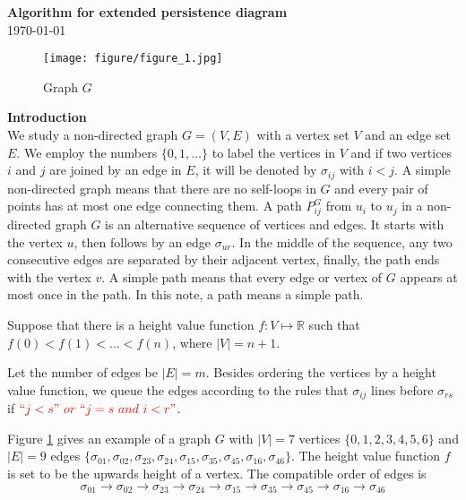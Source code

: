\documentclass[a4paper,12pt]{article}
\title{}
\numberwithin{equation}{section}
\begin{document}
\begin{center}
  \textbf{\Large Algorithm for extended persistence diagram}\\
  \today
\end{center}

\noindent

	\begin{figure}[!hbtp]
		\centering				
		\texttt{[image: figure/figure\_1.jpg]}
		\caption{Graph $G$}
		\label{fig:graph_G}		
	\end{figure}
	
	\noindent
	\textbf{Introduction}\\
	
	We study a non-directed graph $G=(V,E)$ with a vertex set $V$ and an edge set $E$. We employ the numbers $\{0,1,\ldots\}$ to label the vertices in $V$ and if two vertices $i$ and $j$ are joined by an edge in $E$, it will be denoted by $\sigma_{ij}$ with $i<j$. A simple non-directed graph means that there are no self-loops in $G$ and every pair of points has at most one edge connecting them.  A path $P_{ij}^G$ from $u_i$ to $u_j$ in a non-directed graph $G$ is an alternative sequence of vertices and edges. It starts  with the vertex $u$, then follows by an edge $\sigma_{ur}$. In the middle of the sequence, any two consecutive edges are separated by their adjacent vertex, finally, the path ends with the vertex $v$. A simple path means that every edge or vertex of $G$ appears at most once in the path. In this note, a path means a simple path. 
	
	Suppose that there is a height value function $f: V \mapsto \mathbb{R}$ such that $f(0) < f(1) < \ldots <f(n)$, where $\vert V \vert = n+1$. 
	
	Let the number of edges be $\vert E \vert =m$. Besides ordering the vertices by a height value function, we queue the edges according to the rules that $\sigma_{ij}$ lines before $\sigma_{rs}$ if $\color{red} ``j<s" \  or \  ``j=s \ and \ i<r"$.	
	
	Figure \ref{fig:graph_G} gives an example of a graph $G$ with $\vert V \vert =7$ vertices $\{0,1,2,3,4,5,6\}$ and $\vert E \vert =9$ edges $\{\sigma_{01}, \sigma_{02}, \sigma_{23}, \sigma_{24}, \sigma_{15}, \sigma_{35}, \sigma_{45}, \sigma_{16}, \sigma_{46} \}$. The height value function $f$ is set to be the upwards height of a vertex. The compatible order of edges is
	$$ \sigma_{01} \to \sigma_{02} \to \sigma_{23} \to \sigma_{24} \to \sigma_{15} \to \sigma_{35} \to \sigma_{45} \to \sigma_{16} \to \sigma_{46}$$\\
	
\end{document}

